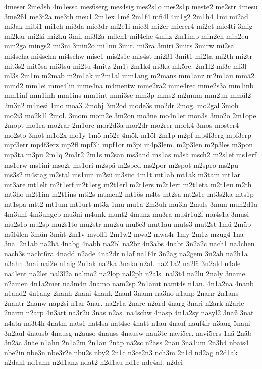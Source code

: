 {4meser
2me3sh
4m1essa
mes6serg
mes4sig
mes2s1o
mes2s1p
meste2
me2str
4mesu
3me2ß1
me3t2a
me3th
meu1
2m1ex
1mé
2m1f4
mfi4l
4m1g2
2m1h4
1mi
mi2ad
mi3ak
mibi1
mi1ch
mi3da
mie3dr
mi2e1i
mie3l
mi2er
mierer4
mi2et
mie4ti
3mig
mi2kar
mi2ki
mi2ku
3mil
mi3l2a
milch1
mil4che
4milz
2m1imp
min2en
min2eu
min2ga
mings2
mi3ni
3min2o
mi1nu
3mir.
mi3ra
3miri
3mirs
3mirw
mi2sa
mi4scha
mi4schn
mi4schw
mise1
mis2s1c
mis4st
mi2ß1
3mit1
mi2ta
mi2th
mi2tr
mit3s2
mit5sa
mi3tsu
mi2tu
4mitz
2m1j
2m1k4
m3ka
mk5re.
2m1l2
ml3c
ml3l
ml3s
2m1m
m2mab
m2m1ak
m2m1al
mm1ang
m2mans
mm1anz
m2m1au
mmä2
mmd2
mm1ei
mme4lin
mme4na
m4mentw
mme2ra2
mme4rec
mme2s3a
mm1inb
mm1inf
mm1inh
mm1ins
mm1int
mmi3sc
mm3p
mms2
m2mum
mm2un
mmül2
2m3n2
m4nesi
1mo
moa3
2mobj
3m2od
mode3s
mo2dr
2mog.
mo2gal
3moh
mo2i3
mo2k1l
2mol.
3mom
mom2e
3m2on
mo3ne
mo4n1er
mon3s
3mo2o
2m1ope
2mopt
mo1ra
mo2rar
2m1orc
mor2d3a
mor2dr
mo2rer
mork4
3mos
moster4
mo2sto
3mot
m1o2x
mo1y
1mö
mö2c
4mök
m1öl
2m1p
m2pf
mp4f3erg
mpf3erp
mpf3err
mp4f3erz
mp2fl
mpf3li
mpf1or
m3pi
m4p3lem.
m2p3len
m2p3les
m3pon
mp3ta
m3pu
2m1q
2m3r2
2m1s
m2san
ms3and
ms1as
m3sä
msch2
m2s1ef
ms1erf
ms1erw
ms1ini
mso2r
ms1ori
m2spä
m2sped
ms2por
m2spot
m2spro
ms2pu
ms3s2
m4stag
m2stal
ms1um
m2sü
m3süc
4m1t
mt1ab
mt1ak
m3tam
mt1ar
mt3are
mt1elt
m2t1erf
m2t1erg
m2t1erl
m2t1ers
m2t1ert
m2t1eta
m2t1eu
m2th
mt3ho
m2t1im
m2t1ins
mti2s
mtmen2
mt1ös
m4ts
mt2sa
mt2s1e
mt3s2ka
mts1p
mt1spa
mtt2
mt1um
mt1urt
mt3z
1mu
mu1a
2m3uh
mu3la
2muls
3mun
mun2d1a
4m3unf
4m3ungeb
mu3ni
m4unk
munt2
4munz
mu3ra
mu4r1u2f
mu4s1a
3musi
mu2s1o
mu2sp
mu2s1to
mu2str
mu2su
muße3
mut1au
muts3
mut2st
1mü
2müb
mül4len
3mün
3müt
2m1v
mvoll1
2m1w2
mwa2
mwa4r
1my
2m1z
mzug4
1na
3na.
2n1ab
na2bä
4nabg
4nabh
na2bl
na2br
4n3abs
4nabt
3n2a2c
nach1
na3chen
nach3s
nacht6ra
4nadd
n2ade
4na2dr
n1af
na1f4r
3n2ag
na2gem
3n2ah
na2h1a
n3ahn
3nai
nai2e
n1aig
2n1ak
na2ka
3nako
n2al.
na2l1a2
na2lä
3n2ald
n4ale
na4lent
na2let
nal3l2a
nalmo2
na2lop
nal2ph
n2als.
nal3t4
na2lu
2naly
3name
n2amen
4n1a2mer
na3m4n
3namo
nam2sp
2n1amt
namt4s
n1an.
4n1a2na
4nanb
n1and2
4n1ang
2nanh
2nani
4nank
2nanl
3nann
na3no
n1anp
2nanr
2n1ans
2nantr
2nanw
nap2si
n1ar
5nar.
na2r1a
2narc
n2ard
4narg
3nari
n2ark
n2arle
2narm
n2arp
4n3art
na3r2u
3nas
n2as.
na4schw
4nasp
4n1a2sy
nasyl2
3naß
3nat
n4ata
na3t4h
4natm
nats1
nat4sa
nat4sc
4natt
n1au
4nauf
nauf4fr
n3aug
5naui
3n2aul
4nausb
4nausg
n2auso
4nauss
4nausw
nau3te
navi5er.
navi5ers
1nä
2näb
3n2äc
3näe
n1ähn
2n1ä2m
2n1än
2näp
nä2sc
n2äss
2näu
3nä1um
2n3b4
nbais4
nbe2in
nbe3n
nbe3r2e
nbu2s
nby2
2n1c
n3ce2n3
nch3m
2n1d
nd2ag
n2d1ak
n2danl
nd1ann
n2d1anz
ndat2
n2d1au
nd1c
nde4al.
n2dei
}
